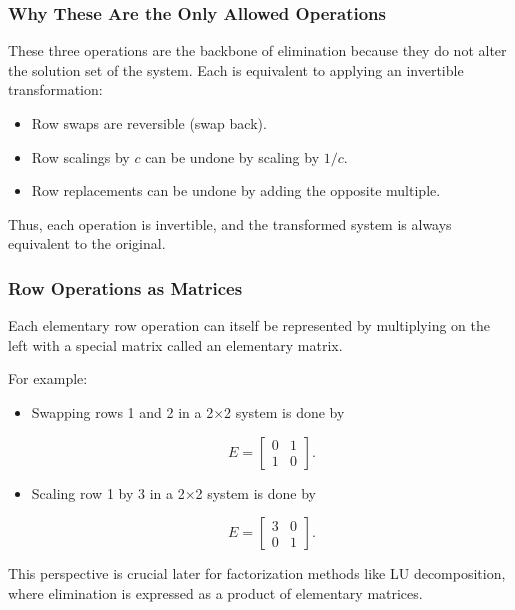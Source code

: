 \documentclass[
  letterpaper,
  DIV=11,
  numbers=noendperiod]{scrreprt}
\providecommand{\tightlist}{%
  \setlength{\itemsep}{0pt}\setlength{\parskip}{0pt}}
\begin{document}
\subsubsection{Why These Are the Only Allowed
Operations}\label{why-these-are-the-only-allowed-operations}

These three operations are the backbone of elimination because they do
not alter the solution set of the system. Each is equivalent to applying
an invertible transformation:

\begin{itemize}
\tightlist
\item
  Row swaps are reversible (swap back).
\item
  Row scalings by \(c\) can be undone by scaling by \(1/c\).
\item
  Row replacements can be undone by adding the opposite multiple.
\end{itemize}

Thus, each operation is invertible, and the transformed system is always
equivalent to the original.

\subsubsection{Row Operations as
Matrices}\label{row-operations-as-matrices}

Each elementary row operation can itself be represented by multiplying
on the left with a special matrix called an elementary matrix.

For example:

\begin{itemize}
\item
  Swapping rows 1 and 2 in a 2×2 system is done by

  \[
  E = \begin{bmatrix} 0 & 1 \\ 1 & 0 \end{bmatrix}.
  \]
\item
  Scaling row 1 by 3 in a 2×2 system is done by

  \[
  E = \begin{bmatrix} 3 & 0 \\ 0 & 1 \end{bmatrix}.
  \]
\end{itemize}

This perspective is crucial later for factorization methods like LU
decomposition, where elimination is expressed as a product of elementary
matrices.
\end{document}
